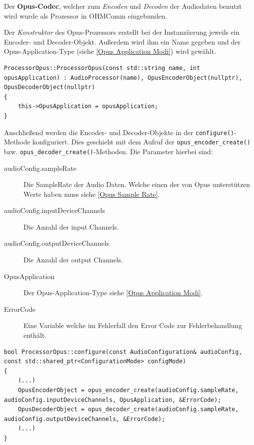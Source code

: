 Der \textbf{Opus-Codec}, welcher zum \textit{Encoden} und \textit{Decoden} der Audiodaten benutzt wird wurde als Prozessor in OHMComm eingebunden.

Der \textit{Konstruktor} des Opus-Prozessors erstellt bei der Instanziierung jeweils ein Encoder- und Decoder-Objekt. Außerdem wird ihm ein Name gegeben und der Opus-Application-Type (siehe \ref{Opus Application Modi}) wird gewählt.

\begin{lstlisting}[caption={Instanziierung des Opus Prozessors},label={Code:Opus Instanziierung}]
ProcessorOpus::ProcessorOpus(const std::string name, int opusApplication) : AudioProcessor(name), OpusEncoderObject(nullptr), OpusDecoderObject(nullptr)
{
    this->OpusApplication = opusApplication;
}
\end{lstlisting}

Anschließend werden die Encoder- und Decoder-Objekte in der \texttt{configure()}-Methode konfiguriert. Dies geschieht mit dem Aufruf der \texttt{opus\_encoder\_create()} bzw. \texttt{opus\_decoder\_create()}-Methoden. Die Parameter hierbei sind:
\begin{description}
\item[audioConfig.sampleRate] Die SampleRate der Audio Daten. Welche einen der von Opus unterstützen Werte haben muss siehe \ref{Opus Sample Rate}.
\item[audioConfig.inputDeviceChannels] Die Anzahl der input Channels.
\item[audioConfig.outputDeviceChannels] Die Anzahl der output Channels.
\item[OpusApplication] Der Opus-Application-Type siehe \ref{Opus Application Modi}.
\item[ErrorCode] Eine Variable welche im Fehlerfall den Error Code zur Fehlerbehandlung enthält.
\end{description}

\begin{lstlisting}[caption={Konfiguration der Opus Encoder und Decoder-Objekte},label={Code:Opus Konfiguration}]
bool ProcessorOpus::configure(const AudioConfiguration& audioConfig, const std::shared_ptr<ConfigurationMode> configMode)
{
	(...)
	OpusEncoderObject = opus_encoder_create(audioConfig.sampleRate, audioConfig.inputDeviceChannels, OpusApplication, &ErrorCode);
	OpusDecoderObject = opus_decoder_create(audioConfig.sampleRate, audioConfig.outputDeviceChannels, &ErrorCode);
	(...)
}
\end{lstlisting}


